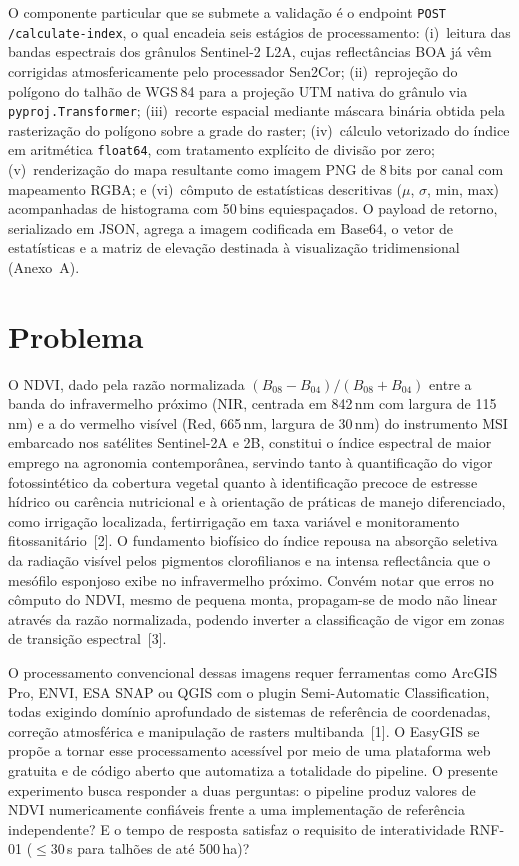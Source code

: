 \documentclass[10pt, a4paper, twocolumn]{article}
\begin{document}
O componente particular que se submete a validação é o endpoint \texttt{POST /calculate-index}, o qual encadeia seis estágios de processamento: (i)~leitura das bandas espectrais dos grânulos Sentinel-2 L2A, cujas reflectâncias BOA já vêm corrigidas atmosfericamente pelo processador Sen2Cor; (ii)~reprojeção do polígono do talhão de WGS\,84 para a projeção UTM nativa do grânulo via \texttt{pyproj.Transformer}; (iii)~recorte espacial mediante máscara binária obtida pela rasterização do polígono sobre a grade do raster; (iv)~cálculo vetorizado do índice em aritmética \texttt{float64}, com tratamento explícito de divisão por zero; (v)~renderização do mapa resultante como imagem PNG de 8\,bits por canal com mapeamento RGBA; e (vi)~cômputo de estatísticas descritivas ($\mu$, $\sigma$, min, max) acompanhadas de histograma com 50\,bins equiespaçados. O payload de retorno, serializado em JSON, agrega a imagem codificada em Base64, o vetor de estatísticas e a matriz de elevação destinada à visualização tridimensional (Anexo~A).

\section{Problema}

O NDVI, dado pela razão normalizada $(B_{08}\!-\!B_{04})/(B_{08}\!+\!B_{04})$ entre a banda do infravermelho próximo (NIR, centrada em 842\,nm com largura de 115\,nm) e a do vermelho visível (Red, 665\,nm, largura de 30\,nm) do instrumento MSI embarcado nos satélites Sentinel-2A e 2B, constitui o índice espectral de maior emprego na agronomia contemporânea, servindo tanto à quantificação do vigor fotossintético da cobertura vegetal quanto à identificação precoce de estresse hídrico ou carência nutricional e à orientação de práticas de manejo diferenciado, como irrigação localizada, fertirrigação em taxa variável e monitoramento fitossanitário~[2]. O fundamento biofísico do índice repousa na absorção seletiva da radiação visível pelos pigmentos clorofilianos e na intensa reflectância que o mesófilo esponjoso exibe no infravermelho próximo. Convém notar que erros no cômputo do NDVI, mesmo de pequena monta, propagam-se de modo não linear através da razão normalizada, podendo inverter a classificação de vigor em zonas de transição espectral~[3].

O processamento convencional dessas imagens requer ferramentas como ArcGIS Pro, ENVI, ESA SNAP ou QGIS com o plugin Semi-Automatic Classification, todas exigindo domínio aprofundado de sistemas de referência de coordenadas, correção atmosférica e manipulação de rasters multibanda~[1]. O EasyGIS se propõe a tornar esse processamento acessível por meio de uma plataforma web gratuita e de código aberto que automatiza a totalidade do pipeline. O presente experimento busca responder a duas perguntas: o pipeline produz valores de NDVI numericamente confiáveis frente a uma implementação de referência independente? E o tempo de resposta satisfaz o requisito de interatividade RNF-01 ($\leq 30$\,s para talhões de até 500\,ha)?
\end{document}

